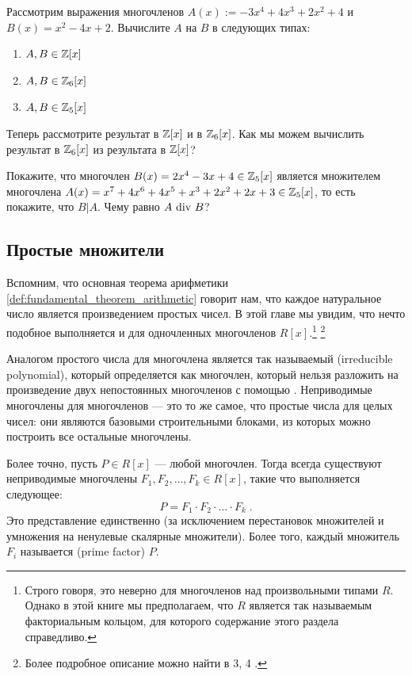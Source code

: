\begin{exercise} Рассмотрим выражения многочленов $A(x):= -3x^4 + 4x^3 + 2x^2 +4$ и $B(x)= x^2-4x+2$. Вычислите  $A$ на $B$ в следующих типах:
\begin{enumerate}
\item $A,B\in \mathbb{Z}[x]$
\item $A,B\in \mathbb{Z}_6[x]$
\item $A,B\in \mathbb{Z}_5[x]$
\end{enumerate}
Теперь рассмотрите результат в $\mathbb{Z}[x]$ и в $\mathbb{Z}_6[x]$. Как мы можем вычислить результат в $\mathbb{Z}_6[x]$ из результата в $\mathbb{Z}[x]$?
\end{exercise}
\begin{exercise}
Покажите, что многочлен $B(x)= 2x^4-3x+4\in \mathbb{Z}_5[x]$ является множителем многочлена $A(x)=x^7 + 4x^6 + 4x^5 + x^3 + 2x^2 + 2x + 3\in\mathbb{Z}_5[x]$, то есть покажите, что $B|A$. Чему равно $A \text{ div } B$?
\end{exercise}
\subsection{Простые множители} Вспомним, что основная теорема арифметики \ref{def:fundamental_theorem_arithmetic} говорит нам, что каждое натуральное число является произведением простых чисел. В этой главе мы увидим, что нечто подобное выполняется и для одночленных многочленов $R[x]$.\footnote{Строго говоря, это неверно для многочленов над произвольными типами $R$. Однако в этой книге мы предполагаем, что $R$ является так называемым факториальным кольцом, для которого содержание этого раздела справедливо.}
\footnote{Более подробное описание можно найти в \chaptname{} 3, \secname{} 4 \cite{mignotte-1992}.}


Аналогом простого числа для многочлена является так называемый  (irreducible polynomial), который определяется как многочлен, который нельзя разложить на произведение двух непостоянных многочленов с помощью . Неприводимые многочлены для многочленов — это то же самое, что простые числа для целых чисел: они являются базовыми строительными блоками, из которых можно построить все остальные многочлены. 

Более точно, пусть $P \in R[x]$ — любой многочлен. Тогда всегда существуют неприводимые многочлены $F_1, F_2, \ldots, F_k \in R[x]$, такие что выполняется следующее:
\begin{equation}
\label{def_polynomial_prime_factorization}
P = F_1 \cdot F_2 \cdot \ldots \cdot F_k \;.
\end{equation}
Это представление единственно (за исключением перестановок множителей и умножения на ненулевые скалярные множители). Более того, каждый множитель $F_i$ называется  (prime factor) $P$.

